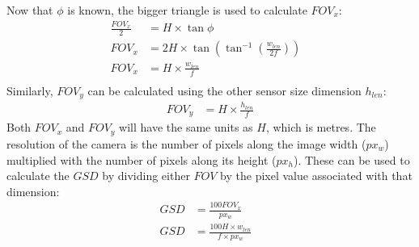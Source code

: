 Now that $\phi$ is known, the bigger triangle is used to calculate $FOV_x$:
\begin{equation}
	\label{eqn:fov_x}
	\begin{aligned}
		\frac{FOV_x}{2} &= H \times \tan{\phi} &\\
		FOV_x &= 2H \times \tan{ (\tan^{-1}{ (\frac{w_{len}}{2f}) }) } &\\
		FOV_x &= H \times \frac{w_{len}}{f} &\\
	\end{aligned}
\end{equation}
Similarly, $FOV_y$ can be calculated using the other sensor size dimension $h_{len}$:
\begin{equation}
	\label{eqn:fov_y}
	\begin{aligned}
		FOV_y &= H \times \frac{h_{len}}{f}
	\end{aligned}
\end{equation}
Both $FOV_x$ and $FOV_y$ will have the same units as $H$, which is metres. The resolution of the camera is the number of pixels along the image width ($px_w$) multiplied with the number of pixels along its height ($px_h$). These can be used to calculate the $GSD$ by dividing either $FOV$ by the pixel value associated with that dimension:
\begin{equation}
	\label{eqn:GSD}
	\begin{aligned}
		GSD &= \frac{100FOV_x}{px_w} &\\
		GSD &= \frac{100H \times w_{len}}{f \times px_w}
	\end{aligned}
\end{equation}

